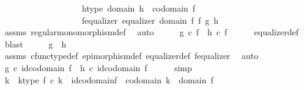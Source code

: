 \begin{isabellebody}
\ \ \ \ \ \ \ \ \ \ \ \ \ \ \ \ \ \ \ h{\isacharunderscore}{\kern0pt}type{\isacharcolon}{\kern0pt}\ {\isachardoublequoteopen}domain\ h\ {\isacharequal}{\kern0pt}\ codomain\ f{\isachardoublequoteclose}\ \isanewline
\ \ \ \ \ \ \ \ \ \ \ \ \ \ \ \ \ \ \ f{\isacharunderscore}{\kern0pt}equalizer{\isacharcolon}{\kern0pt}\ {\isachardoublequoteopen}equalizer\ {\isacharparenleft}{\kern0pt}domain\ f{\isacharparenright}{\kern0pt}\ f\ g\ h{\isachardoublequoteclose}\isanewline
\ \ \ \ \isamarkupfalse%
\ assms{\isacharparenleft}{\kern0pt}{}{\isacharparenright}{\kern0pt}\ regular{\isacharunderscore}{\kern0pt}monomorphism{\isacharunderscore}{\kern0pt}def\ \isamarkupfalse%
\ auto\isanewline
\ \ \isamarkupfalse%
\ \isamarkupfalse%
\ {\isachardoublequoteopen}g\ {\isasymcirc}\isactrlsub c\ f\ {\isacharequal}{\kern0pt}\ h\ {\isasymcirc}\isactrlsub c\ f{\isachardoublequoteclose}\isanewline
\ \ \ \ \isamarkupfalse%
\ equalizer{\isacharunderscore}{\kern0pt}def\ \isamarkupfalse%
\ blast\isanewline
\ \ \isamarkupfalse%
\ \isamarkupfalse%
\ {\isachardoublequoteopen}g\ {\isacharequal}{\kern0pt}\ h{\isachardoublequoteclose}\isanewline
\ \ \ \ \isamarkupfalse%
\ assms{\isacharparenleft}{\kern0pt}{}{\isacharparenright}{\kern0pt}\ cfunc{\isacharunderscore}{\kern0pt}type{\isacharunderscore}{\kern0pt}def\ epimorphism{\isacharunderscore}{\kern0pt}def\ equalizer{\isacharunderscore}{\kern0pt}def\ f{\isacharunderscore}{\kern0pt}equalizer\ \isamarkupfalse%
\ auto\isanewline
\ \ \isamarkupfalse%
\ \isamarkupfalse%
\ {\isachardoublequoteopen}g\ {\isasymcirc}\isactrlsub c\ id{\isacharparenleft}{\kern0pt}codomain\ f{\isacharparenright}{\kern0pt}\ {\isacharequal}{\kern0pt}\ h\ {\isasymcirc}\isactrlsub c\ id{\isacharparenleft}{\kern0pt}codomain\ f{\isacharparenright}{\kern0pt}{\isachardoublequoteclose}\isanewline
\ \ \ \ \isamarkupfalse%
\ simp\isanewline
\ \ \isamarkupfalse%
\ \isamarkupfalse%
\ k\ \ k{\isacharunderscore}{\kern0pt}type{\isacharcolon}{\kern0pt}\ {\isachardoublequoteopen}f\ {\isasymcirc}\isactrlsub c\ k\ {\isacharequal}{\kern0pt}\ id{\isacharparenleft}{\kern0pt}codomain{\isacharparenleft}{\kern0pt}f{\isacharparenright}{\kern0pt}{\isacharparenright}{\kern0pt}\ {\isasymand}\ codomain\ k\ {\isacharequal}{\kern0pt}\ domain\ f{\isachardoublequoteclose}\isanewline
\ \ \ \ \isamarkupfalse%

\end{isabellebody}
